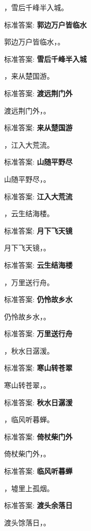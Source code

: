 \documentclass[12pt, a4paper, addpoints]{exam}
\begin{document}
\begin{questions}
\question[1] \uline{\qquad\qquad\qquad}，雪后千峰半入城。

标准答案: \textbf{郭边万户皆临水}

\question[1] 郭边万户皆临水，\uline{\qquad\qquad\qquad}。

标准答案: \textbf{雪后千峰半入城}

\question[1] \uline{\qquad\qquad\qquad}，来从楚国游。

标准答案: \textbf{渡远荆门外}

\question[1] 渡远荆门外，\uline{\qquad\qquad\qquad}。

标准答案: \textbf{来从楚国游}

\question[1] \uline{\qquad\qquad\qquad}，江入大荒流。

标准答案: \textbf{山随平野尽}

\question[1] 山随平野尽，\uline{\qquad\qquad\qquad}。

标准答案: \textbf{江入大荒流}

\question[1] \uline{\qquad\qquad\qquad}，云生结海楼。

标准答案: \textbf{月下飞天镜}

\question[1] 月下飞天镜，\uline{\qquad\qquad\qquad}。

标准答案: \textbf{云生结海楼}

\question[1] \uline{\qquad\qquad\qquad}，万里送行舟。

标准答案: \textbf{仍怜故乡水}

\question[1] 仍怜故乡水，\uline{\qquad\qquad\qquad}。

标准答案: \textbf{万里送行舟}

\question[1] \uline{\qquad\qquad\qquad}，秋水日潺湲。

标准答案: \textbf{寒山转苍翠}

\question[1] 寒山转苍翠，\uline{\qquad\qquad\qquad}。

标准答案: \textbf{秋水日潺湲}

\question[1] \uline{\qquad\qquad\qquad}，临风听暮蝉。

标准答案: \textbf{倚杖柴门外}

\question[1] 倚杖柴门外，\uline{\qquad\qquad\qquad}。

标准答案: \textbf{临风听暮蝉}

\question[1] \uline{\qquad\qquad\qquad}，墟里上孤烟。

标准答案: \textbf{渡头余落日}

\question[1] 渡头馀落日，\uline{\qquad\qquad\qquad}。


\end{questions}
\end{document}
